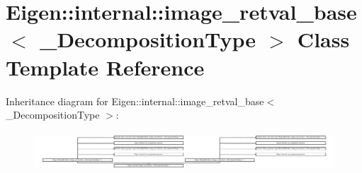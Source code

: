 \hypertarget{struct_eigen_1_1internal_1_1image__retval__base}{}\section{Eigen\+:\+:internal\+:\+:image\+\_\+retval\+\_\+base$<$ \+\_\+\+Decomposition\+Type $>$ Class Template Reference}
\label{struct_eigen_1_1internal_1_1image__retval__base}
Inheritance diagram for Eigen\+:\+:internal\+:\+:image\+\_\+retval\+\_\+base$<$ \+\_\+\+Decomposition\+Type $>$\+:\begin{figure}[H]
\begin{center}
\leavevmode
\includegraphics[height=1.471103cm]{struct_eigen_1_1internal_1_1image__retval__base}
\end{center}
\end{figure}
